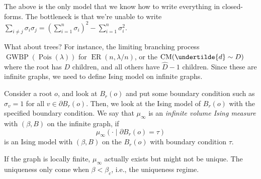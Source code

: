 The above is the only model that we know how to write everything in closed-forms. The bottleneck is that we're unable to write \(\sum_{i \neq j} \sigma _i \sigma _j = (\sum_{i=1}^{n} \sigma _i)^2 - \sum_{i=1}^{n} \sigma _i^2\).

What about trees? For instance, the limiting branching process \(\operatorname{GWBP}(\operatorname{Pois}(\lambda ) ) \) for \(\operatorname{ER}(n, \lambda / n) \), or the \(\operatorname{CM}(\undertilde{d} \sim D) \) where the root has \(D\) children, and all others have \(\hat{D} - 1\) children. Since these are infinite graphs, we need to define Ising model on infinite graphs.

\begin{intuition}
	Consider a root \(o\), and look at \(B_r(o)\) and put some boundary condition such as \(\sigma _v = 1\) for all \(v \in \partial B_r(o) \). Then, we look at the Ising model of \(B_r(o)\) with the specified boundary condition. We say that \(\mu _\infty \) is an \emph{infinite volume Ising measure} with \((\beta , B)\) on the infinite graph, if
	\[
		\mu _\infty (\cdot \mid \partial B_r(o) = \tau )
	\]
	is an Ising model with \((\beta , B)\) on the \(B_r(o)\) with boundary condition \(\tau \).
\end{intuition}

If the graph is locally finite, \(\mu _\infty \) actually exists but might not be unique. The uniqueness only come when \(\beta < \beta _c\), i.e., the uniqueness regime.

